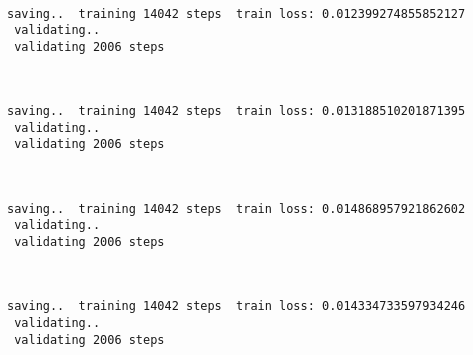 \documentclass[11pt]{article}
\begin{document}
    \begin{center}
    \end{center}
    { \hspace*{\fill} \\}
    
    \begin{Verbatim}[commandchars=\\\{\}]
 saving..  training 14042 steps  train loss: 0.012399274855852127
 validating..
 validating 2006 steps
    \end{Verbatim}

    \begin{center}
    \end{center}
    { \hspace*{\fill} \\}
    
    \begin{Verbatim}[commandchars=\\\{\}]
 saving..  training 14042 steps  train loss: 0.013188510201871395
 validating..
 validating 2006 steps
    \end{Verbatim}

    \begin{center}
    \end{center}
    { \hspace*{\fill} \\}
    
    \begin{Verbatim}[commandchars=\\\{\}]
 saving..  training 14042 steps  train loss: 0.014868957921862602
 validating..
 validating 2006 steps
    \end{Verbatim}

    \begin{center}
    \end{center}
    { \hspace*{\fill} \\}
    
    \begin{Verbatim}[commandchars=\\\{\}]
 saving..  training 14042 steps  train loss: 0.014334733597934246
 validating..
 validating 2006 steps
    \end{Verbatim}
\end{document}
